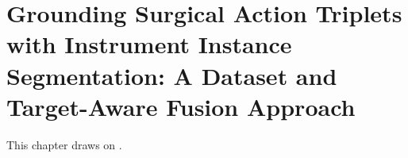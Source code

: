 \chapter{Grounding Surgical Action Triplets with Instrument Instance Segmentation: A Dataset and Target-Aware Fusion Approach}
\label{chap:triplet-grounding}
\minitoc

This chapter draws on .

\begingroup
\setlength{\emergencystretch}{2em}
\graphicspath{{phd_papers/sources/Surgical Action Triplet Segmentation IPCAI/}}
\providecommand{\ivttriplet}{\texttt{$\langle$instrument, verb, target$\rangle$}\xspace}
\providecommand{\vtpair}{\texttt{$\langle$verb, target$\rangle$}\xspace}
\providecommand{\ivpair}{\texttt{$\langle$instrument, verb$\rangle$}\xspace}
\providecommand{\itpair}{\texttt{$\langle$instrument, target$\rangle$}\xspace}
\providecommand{\triplet}[3]{\texttt{$\langle$#1, #2, #3$\rangle$}\xspace}
\providecommand{\pair}[2]{\texttt{$\langle$#1, #2$\rangle$}\xspace}
\providecommand{\singlet}[1]{\texttt{$\langle$#1$\rangle$}\xspace}
\providecommand{\apivt}{\texttt{$AP_{IVT}$}\xspace}
\providecommand{\anatprior}{weak anatomy\xspace}
\providecommand{\Anatprior}{Weak anatomy\xspace}
\providecommand{\AnatPrior}{Weak Anatomy\xspace}
\providecommand{\mAP}{\textrm{mAP}}
\providecommand{\figref}[1]{\figurename~\ref{#1}}
\providecommand{\tabref}[1]{\tablename~\ref{#1}}
\providecommand{\secref}[1]{Section~\ref{#1}}
\providecommand{\mysubsection}[1]{\subparagraph{#1}}
\providecommand{\revref}[2]{\ignorespaces}
\providecommand{\robustrevref}[2]{\ignorespaces}
\providecommand{\revmod}[1]{#1\xspace}
\providecommand{\revnew}[1]{#1\xspace}
\providecommand{\revdel}[1]{\ignorespaces}


\endgroup
